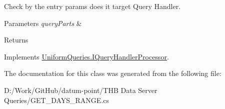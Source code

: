 Check by the entry params does it target Query Handler. 


\begin{DoxyParams}{Parameters}
{\em query\+Parts} & \\
\hline
\end{DoxyParams}
\begin{DoxyReturn}{Returns}

\end{DoxyReturn}


Implements \mbox{\hyperlink{interface_uniform_queries_1_1_i_query_handler_processor_a0edbfe93aab9f1787e4dc0311f7695c7}{Uniform\+Queries.\+I\+Query\+Handler\+Processor}}.



The documentation for this class was generated from the following file\+:\begin{DoxyCompactItemize}
\item 
D\+:/\+Work/\+Git\+Hub/datum-\/point/\+T\+H\+B Data Server Queries/G\+E\+T\+\_\+\+D\+A\+Y\+S\+\_\+\+R\+A\+N\+G\+E.\+cs\end{DoxyCompactItemize}
